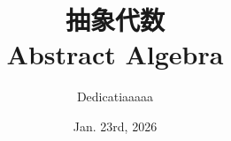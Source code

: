 \DeclareMathOperator{\GL}{GL}                           %
\DeclareMathOperator{\SL}{SL}                           %

\DeclareMathOperator{\chara}{char}                         %
\DeclareMathOperator{\Frac}{Frac}                         %
\DeclareMathOperator{\Gal}{Gal}                           %

\DeclareMathOperator{\lcm}{lcm}                          %
\DeclareMathOperator{\sgn}{sgn}                          %

\DeclareMathOperator{\Hom}{Hom}                         %
\DeclareMathOperator{\End}{End}                         %
\DeclareMathOperator{\Aut}{Aut}                         %
\DeclareMathOperator{\Isom}{Isom}                       %
\DeclareMathOperator{\Inn}{Inn}                         %
\DeclareMathOperator{\Out}{Out}                         %

\DeclareMathOperator{\Orb}{Orb}                         %
\DeclareMathOperator{\Ord}{Ord}                         %
\DeclareMathOperator{\Sym}{Sym}                         %
\DeclareMathOperator{\Cont}{Cont}                       %
\DeclareMathOperator{\Ga}{Gal}                           %


\newcommand{\colora}[1]{\textcolor{red}{#1}}
\newcommand{\colorb}[1]{\textcolor{blue4}{#1}}
\newcommand{\colorc}[1]{\textcolor{blue6}{#1}}
\newcommand{\colord}[1]{\textcolor{darkpurple}{#1}}

\newcommand{\nohref}[1]{\textcolor{darkpurple}{``#1''}}
\newcommand{\nohrefconcept}[1]{\textcolor{blue4}{``#1''}}

\newcommand{\continued}{{\Large\textbf{To be Continued...}}}
\newcommand{\bysorry}{\fcolorbox{white}{gray!20!white}{\texttt{\textcolor{black}{:= }\textcolor{blue}{by }\textcolor{red}{\textbf{sorry}}}}\;\faTimesCircle\;\,\texttt{\textcolor{gray}{{\footnotesize declaration uses 'sorry'.}}}}

\newcommand{\Dedicatia}{{\fontik\textcolor{darkpurple}{Dedicatia}}}

\usepackage{fancyhdr}
\pagestyle{fancy}

\fancyhf{}

\renewcommand{\headrulewidth}{0.4pt}
\renewcommand{\footrulewidth}{0.25pt}


\title{{\huge 抽象代数} \\ Abstract Algebra}
\author{Dedicatiaaaaa}
\date{Jan. 23rd, 2026}

